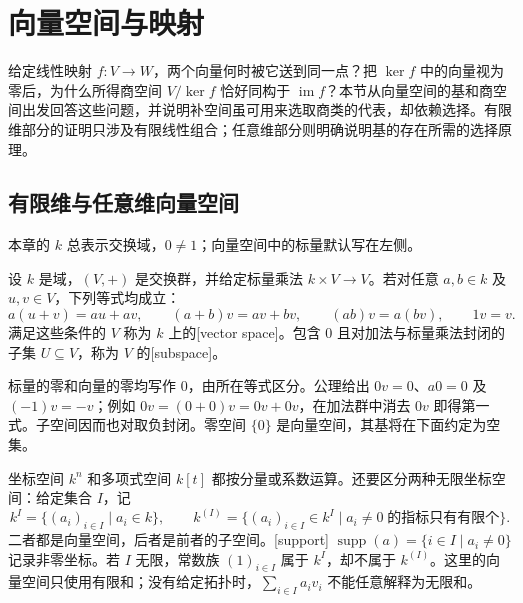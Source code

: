 
\section{向量空间与映射}
\label{b2:sec:0101}

给定线性映射 \(f:V\to W\)，两个向量何时被它送到同一点？把 \(\ker f\) 中的向量视为零后，为什么所得商空间 \(V/\ker f\) 恰好同构于 \(\operatorname{im}f\)？本节从向量空间的基和商空间出发回答这些问题，并说明补空间虽可用来选取商类的代表，却依赖选择。有限维部分的证明只涉及有限线性组合；任意维部分则明确说明基的存在所需的选择原理。

%
%

\subsection{有限维与任意维向量空间}
\label{b2:subsec:0101:01}

本章的 \(k\) 总表示交换域，\(0\ne1\)；向量空间中的标量默认写在左侧。

\begin{definition}\label{b2:def:vector-space}
	设 \(k\) 是域，\((V,+)\) 是交换群，并给定标量乘法 \(k\times V\to V\)。若对任意 \(a,b\in k\) 及 \(u,v\in V\)，下列等式均成立：
	\[
		a(u+v)=au+av,\qquad (a+b)v=av+bv,\qquad (ab)v=a(bv),\qquad 1v=v.
	\]
	满足这些条件的 \(V\) 称为 \(k\) 上的[vector space]。包含 \(0\) 且对加法与标量乘法封闭的子集 \(U\subseteq V\)，称为 \(V\) 的[subspace]。
\end{definition}

标量的零和向量的零均写作 \(0\)，由所在等式区分。公理给出 \(0v=0\)、\(a0=0\) 及 \((-1)v=-v\)；例如 \(0v=(0+0)v=0v+0v\)，在加法群中消去 \(0v\) 即得第一式。子空间因而也对取负封闭。零空间 \(\{0\}\) 是向量空间，其基将在下面约定为空集。

\ProseParagraphBreak
坐标空间 \(k^n\) 和多项式空间 \(k[t]\) 都按分量或系数运算。还要区分两种无限坐标空间：给定集合 \(I\)，记
\[
	k^I=\{(a_i)_{i\in I}\mid a_i\in k\},\qquad k^{(I)}=\{(a_i)_{i\in I}\in k^I\mid a_i\ne0\;\text{的指标只有有限个}\}.
\]
二者都是向量空间，后者是前者的子空间。[support] \(\operatorname{supp}(a)=\{i\in I\mid a_i\ne0\}\) 记录非零坐标。若 \(I\) 无限，常数族 \((1)_{i\in I}\) 属于 \(k^I\)，却不属于 \(k^{(I)}\)。这里的向量空间只使用有限和；没有给定拓扑时，\(\sum_{i\in I}a_iv_i\) 不能任意解释为无限和。


